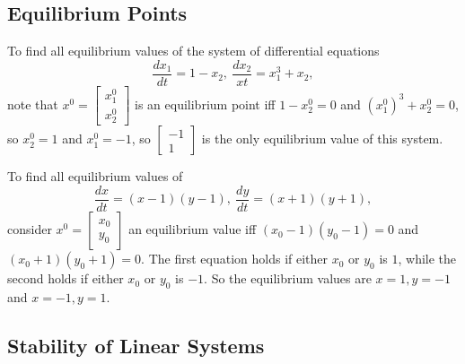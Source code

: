\subsection{Equilibrium Points}
\begin{example}
    To find all equilibrium values of the system of differential equations \[
    \frac{dx_1}{dt}=1-x_2,\ \frac{dx_2}{xt}=x_1^3+x_2,
    \] note that $x^0=
    \begin{bmatrix}
        x_1^0\\x_2^0
    \end{bmatrix}$ is an equilibrium point iff $1-x_2^0=0$ and $(x_1^0)^3+x_2^0=0$, so $x_2^0=1$ and $x_1^0=-1$, so $
    \begin{bmatrix}
        -1\\1
    \end{bmatrix}$ is the only equilibrium value of this system.
\end{example}
\begin{example}
    To find all equilibrium values of \[
        \frac{dx}{dt}=(x-1)(y-1), \ \frac{dy}{dt}=(x+1)(y+1),
    \] consider $x^0=
    \begin{bmatrix}
        x_0\\y_0
    \end{bmatrix}$ an equilibrium value iff $(x_0-1)(y_0-1)=0$ and $(x_0+1)(y_0+1)=0$. The first equation holds if either $x_0$ or $y_0$ is $1$, while the second holds if either $x_0$ or $y_0$ is $-1$. So the equilibrium values are $x=1,y=-1$ and $x=-1,y=1$.
\end{example}

\subsection{Stability of Linear Systems}

